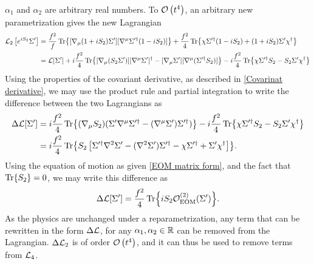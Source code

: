 \documentclass{article}
\begin{document}
$\alpha_1$ and $\alpha_2$ are arbitrary real numbers. To $\Oh[4]{t}$, an arbitrary new parametrization gives the new Lagrangian
\begin{align*}
    \Ell_2\left[e^{i S_2}\Sigma '\right]
    & =
    \frac{f^2}{f}\Tr{[\nabla_\mu (1 +i S_2)\Sigma'][\nabla^\mu \Sigma'^\dagger  (1 - i S_2)]}
    + \frac{f^2}{4} \Tr{\chi\Sigma'^\dagger (1 - i S_2) + (1 +i S_2)\Sigma' \chi^\dagger} \\
    & = \Ell[\Sigma'] + 
    i \frac{f^2}{4}
    \Tr{[\nabla_\mu (S_2\Sigma')][\nabla^\mu\Sigma']^\dagger 
    -  [\nabla_\mu\Sigma'][\nabla^\mu (\Sigma'^\dagger  S_2) ]}
    - i \frac{f^2}{4} \Tr{\chi \Sigma'^\dagger S_2 - S_2 \Sigma' \chi^\dagger}
\end{align*}
Using the properties of the covariant derivative, as described in \autoref{Covarinat derivative}, we may use the product rule and partial integration to write the difference between the two Lagrangians as
\begin{align*}
    \Delta \Ell[\Sigma'] 
    & = 
    i \frac{f^2}{4}
    \Tr{
        (\nabla_\mu S_2)
        (\Sigma' \nabla^\mu \Sigma'^\dagger - (\nabla^\mu \Sigma') \Sigma'^\dagger) 
    }
    - i \frac{f^2}{4} \Tr{\chi \Sigma'^\dagger  S_2 - S_2 \Sigma' \chi^\dagger} \\
    & = 
    i \frac{f^2}{4}
    \Tr{
        S_2
        \left[
            \Sigma'^\dagger\nabla^2 \Sigma' - ( \nabla^2 \Sigma') \Sigma'^\dagger 
            - \chi\Sigma'^\dagger + \Sigma' \chi^\dagger
        \right]
    }.
\end{align*}
Using the equation of motion as given \autoref{EOM matrix form}, and the fact that $\Tr{S_2} = 0$, we may write this difference as
\begin{align*}
    \Delta \Ell[\Sigma'] = \frac{f^2}{4} \Tr{i S_2 \mathcal{O}_\mathrm{EOM}^{(2)}(\Sigma')}.
\end{align*}
As the physics are unchanged under a reparametrization, any term that can be rewritten in the form $\Delta \Ell$, for any $\alpha_1, \alpha_2 \in \R$ can be removed from the Lagrangian.
$\Delta \Ell_2$ is of order $\Oh[4]{t}$, and it can thus be used to remove terms from $\Ell_4$.
 
\end{document}
